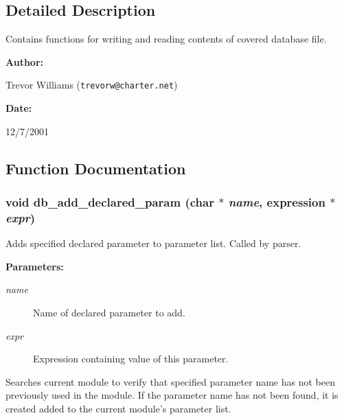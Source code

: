 \subsection{Detailed Description}
Contains functions for writing and reading contents of covered database file.



\begin{Desc}
\item[{\bf Author: }]\par
Trevor Williams ({\tt trevorw@charter.net}) \end{Desc}
\begin{Desc}
\item[{\bf Date: }]\par
12/7/2001

\end{Desc}


\subsection{Function Documentation}
\subsubsection{\setlength{\rightskip}{0pt plus 5cm}void db\_\-add\_\-declared\_\-param (char $\ast$ {\em name}, {\bf expression} $\ast$ {\em expr})}\label{db_8h_a4}


Adds specified declared parameter to parameter list. Called by parser.

\begin{Desc}
\item[{\bf Parameters: }]\par
\begin{description}
\item[
{\em name}]Name of declared parameter to add. \item[
{\em expr}]Expression containing value of this parameter.

\end{description}
\end{Desc}
Searches current module to verify that specified parameter name has not been previously used in the module. If the parameter name has not been found, it is created added to the current module's parameter list. 
